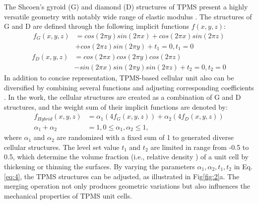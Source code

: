 \documentclass[preprint,review,12pt,authoryear]{elsarticle}
\begin{document}
The Shcoen's gyroid (G) and diamond (D) structures of TPMS present a highly versatile geometry with notably wide range of elastic modulus \citep{Lee2016}. The structures of G and D are defined through the following implicit functions $f(x,y,z)$:
\begin{equation}
\begin{aligned}
f_G(x,y,z)&= cos(2\pi y)sin(2\pi x)+cos(2\pi x)sin(2\pi z)\\&+cos(2\pi z)sin(2\pi y)+t_1 = 0, t_1 =0
\end{aligned}
\label{eq:15}
\end{equation}
\begin{equation}
\begin{aligned}
f_D(x,y,z)&=cos(2\pi x)cos(2\pi y)cos(2\pi z)\\&-sin(2\pi x)sin(2\pi y)sin(2\pi z)+t_2=0, t_2 =0
\end{aligned}
\label{eq:16}
\end{equation}
In addition to concise representation, TPMS-based cellular unit also can be diversified by combining several functions and adjusting corresponding coefficients \citep{Wang2019b}. In the work, the cellular structures are created as a combination of G and D structures, and the weight sum of their implicit functions are denoted by:
\begin{equation}
\begin{aligned}
    f_{Hybrid}(x, y, z) &=\alpha_1 (4f_G(x,y,z))+\alpha_2(4f_D(x, y,z ))\\
    \alpha_1+\alpha_2 &= 1,
    0\leq\alpha_1, \alpha_2 \leq1,
\end{aligned}
\label{eq:17}
\end{equation}
where $\alpha_1$ and $\alpha_2$ are randomized with a fixed sum of 1 to generated diverse cellular structures. The level set value $t_1$ and $t_2$ are limited in range from -0.5 to 0.5, which determine the volume fraction (i.e., relative density ) of a unit cell by thickening or thinning the surfaces. By varying the parameters $\alpha_1, \alpha_2, t_1, t_2$ in Eq.\ref{eq:4}, the TPMS structures can be adjusted, as illustrated in Fig\ref{fig:2}a. The merging operation not only produces geometric variations but also influences the mechanical properties of TPMS unit cells. 
\end{document}
